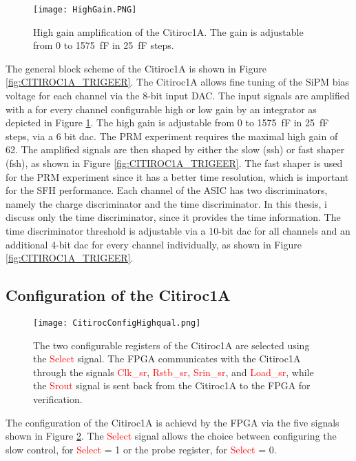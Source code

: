\begin{figure}[h]
    \centering
    \texttt{[image: HighGain.PNG]}
    \caption{High gain amplification of the Citiroc1A. The gain is adjustable from 0 to \SI{1575}{\femto\farad} in \SI{25}{\femto\farad} steps.\autocite{datasheetCITIROC}}
    \label{HighGain}
\end{figure}
The general block scheme of the Citiroc1A is shown in Figure \ref{fig:CITIROC1A_TRIGEER}.
\newline
The Citiroc1A allows fine tuning of the SiPM bias voltage for each channel via the 8-bit input DAC.
\newline	
The input signals are amplified with a for every channel configurable high or low gain by an integrator as depicted in Figure \ref{HighGain}.
The high gain is adjustable from 0 to \SI{1575}{\femto\farad} in \SI{25}{\femto\farad} steps, via a 6 bit dac.\autocite{datasheetCITIROC}
The PRM experiment requires the maximal high gain of 62.\autocite{InternalcommunicationIgor}
\newline
The amplified signals are then shaped by either the slow (ssh) or fast shaper (fsh), as shown in Figure \ref{fig:CITIROC1A_TRIGEER}. 
The fast shaper is used for the PRM experiment since it has a better time resolution, which is important for the SFH performance.\autocite{datasheetCITIROC}
\newline
Each channel of the ASIC has two discriminators, namely the charge discriminator and the time discriminator. In this thesis, i discuss only the time discriminator,
since it provides the time information.
The time discriminator threshold is adjustable via a 10-bit dac for all channels and an additional 4-bit dac for every channel individually, as shown in Figure \ref{fig:CITIROC1A_TRIGEER}\autocite{datasheetCITIROC}.

\subsection{Configuration of the Citiroc1A}\label{sec:configuration}
\begin{figure}[h]
    \centering
    \texttt{[image: CitirocConfigHighqual.png]}
    \caption{The two configurable registers of the Citiroc1A are selected using the \textcolor{red}{Select} signal. 
    The FPGA communicates with the Citiroc1A through the signals \textcolor{red}{Clk\_sr}, \textcolor{red}{Rstb\_sr}, 
    \textcolor{red}{Srin\_sr}, and \textcolor{red}{Load\_sr}, while the \textcolor{red}{Srout} signal is sent back from the Citiroc1A to the FPGA for verification.\autocite{datasheetCITIROC}}
    \label{fig:CITIROC1A_config}
\end{figure}
The configuration of the Citiroc1A is achievd by the FPGA via the five signals shown in Figure \ref{fig:CITIROC1A_config}.
The \textcolor{red}{Select} signal allows the choice between configuring the slow control, for \textcolor{red}{Select} = 1  or the probe register, for \textcolor{red}{Select} = 0.\autocite{datasheetCITIROC}

